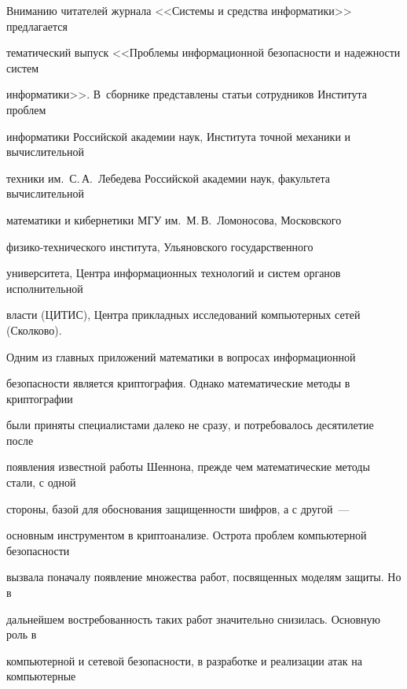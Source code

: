       


            \label{st\stat}     


      








     Вниманию читателей журнала <<Системы и средства информатики>> предлагается 


тематический выпуск <<Проблемы информационной безопасности и надежности систем 


информатики>>. В~сборнике представлены статьи сотрудников Института проблем 


информатики Российской академии наук, Института точной механики и вычислительной 


техники им.\ С.\,А.~Лебедева Российской академии наук, факультета вычислительной 


математики и кибернетики МГУ им.\ М.\,В.~Ломоносова, Московского 


     фи\-зи\-ко-тех\-ни\-че\-ско\-го института, Ульяновского государственного 


университета, Центра информационных технологий и систем органов исполнительной 


власти (ЦИТИС), Центра прикладных исследований компьютерных сетей (Сколково).


     


     Одним из главных приложений математики в вопросах информационной  


безопас\-ности является криптография. Однако математические методы в крип\-то\-гра\-фии 


были приняты специалистами далеко не сразу, и потребовалось десятилетие после 


появления известной работы Шеннона, прежде чем математические методы стали, с одной 


стороны, базой для обоснования защищенности шифров, а с другой~---  


основным инструментом в криптоанализе. Острота проблем компьютерной безопас\-ности 


вызвала поначалу появление множества работ, посвященных моделям защиты. Но в 


дальнейшем востребованность таких работ значительно снизилась. Основную роль в 


компьютерной и сетевой безопас\-ности, в разработке и реализации атак на компьютерные 


